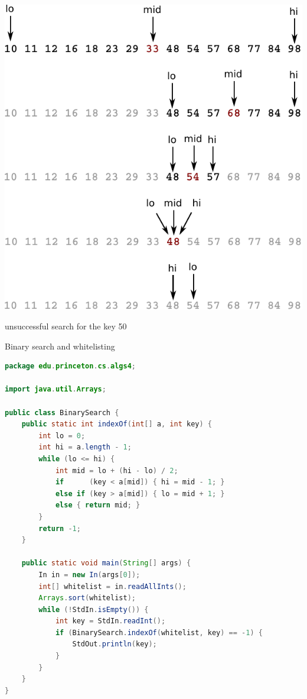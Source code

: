 \documentclass[8pt,a4paper,compress]{beamer}
\begin{document}
\begin{frame}[fragile]
\begin{center}
\includegraphics[scale=0.65]{./figures/bs2.pdf}

\smallskip

unsuccessful search for the key 50
\end{center}
\end{frame}

\begin{frame}[fragile]
Binary search and whitelisting

\begin{lstlisting}[language=Java]
package edu.princeton.cs.algs4;

import java.util.Arrays;

public class BinarySearch {
    public static int indexOf(int[] a, int key) {
        int lo = 0;
        int hi = a.length - 1;
        while (lo <= hi) {
            int mid = lo + (hi - lo) / 2;
            if      (key < a[mid]) { hi = mid - 1; }
            else if (key > a[mid]) { lo = mid + 1; }
            else { return mid; }
        }
        return -1;
    }

    public static void main(String[] args) {
        In in = new In(args[0]);
        int[] whitelist = in.readAllInts();
        Arrays.sort(whitelist);
        while (!StdIn.isEmpty()) {
            int key = StdIn.readInt();
            if (BinarySearch.indexOf(whitelist, key) == -1) {
                StdOut.println(key);
            }
        }
    }
}
\end{lstlisting}
\end{frame}
\end{document}
